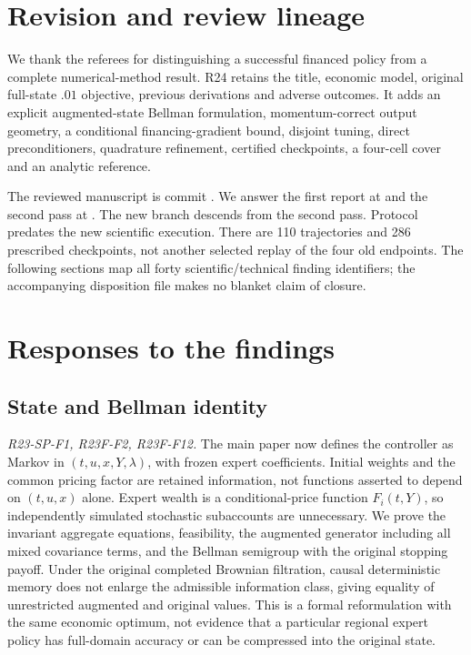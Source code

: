 \section{Revision and review lineage}
We thank the referees for distinguishing a successful financed policy from a complete numerical-method result. R24 retains the title, economic model, original full-state $.01$ objective, previous derivations and adverse outcomes. It adds an explicit augmented-state Bellman formulation, momentum-correct output geometry, a conditional financing-gradient bound, disjoint tuning, direct preconditioners, quadrature refinement, certified checkpoints, a four-cell cover and an analytic reference.

The reviewed manuscript is commit . We answer the first report at  and the second pass at . The new branch descends from the second pass. Protocol  predates the new scientific execution. There are 110 trajectories and 286 prescribed checkpoints, not another selected replay of the four old endpoints. The following sections map all forty scientific/technical finding identifiers; the accompanying disposition file makes no blanket claim of closure.

\section{Responses to the findings}
\subsection{State and Bellman identity}
\noindent\textit{R23-SP-F1, R23F-F2, R23F-F12.}
The main paper now defines the controller as Markov in $(t,u,x,Y,\lambda)$, with frozen expert coefficients. Initial weights and the common pricing factor are retained information, not functions asserted to depend on $(t,u,x)$ alone. Expert wealth is a conditional-price function $F_i(t,Y)$, so independently simulated stochastic subaccounts are unnecessary. We prove the invariant aggregate equations, feasibility, the augmented generator including all mixed covariance terms, and the Bellman semigroup with the original stopping payoff. Under the original completed Brownian filtration, causal deterministic memory does not enlarge the admissible information class, giving equality of unrestricted augmented and original values. This is a formal reformulation with the same economic optimum, not evidence that a particular regional expert policy has full-domain accuracy or can be compressed into the original state.

